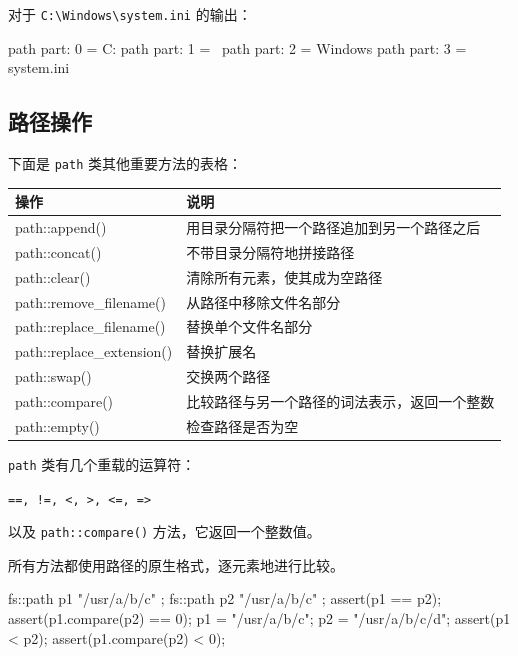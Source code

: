 对于 \texttt{C:\textbackslash Windows\textbackslash system.ini} 的输出：

\begin{codebox}[cpp]
path part: 0 = C:
path part: 1 = \
path part: 2 = Windows
path part: 3 = system.ini
\end{codebox}

\subsection{路径操作}

下面是 \texttt{path} 类其他重要方法的表格：

\begin{table}[H]
\centering
\begin{tabularx}{\textwidth}{>{\ttfamily\raggedright\arraybackslash}X >{\raggedright\arraybackslash}X}
\toprule
操作 & 说明 \\
\midrule
path::append() & 用目录分隔符把一个路径追加到另一个路径之后 \\
path::concat() & 不带目录分隔符地拼接路径 \\
path::clear() & 清除所有元素，使其成为空路径 \\
path::remove\_filename() & 从路径中移除文件名部分 \\
path::replace\_filename() & 替换单个文件名部分 \\
path::replace\_extension() & 替换扩展名 \\
path::swap() & 交换两个路径 \\
path::compare() & 比较路径与另一个路径的词法表示，返回一个整数 \\
path::empty() & 检查路径是否为空 \\
\bottomrule
\end{tabularx}
\end{table}


\texttt{path} 类有几个重载的运算符：

\texttt{==, !=, <, >, <=, =>}

以及 \texttt{path::compare()} 方法，它返回一个整数值。

所有方法都使用路径的原生格式，逐元素地进行比较。

\begin{codebox}[cpp]
fs::path p1 { "/usr/a/b/c" };
fs::path p2 { "/usr/a/b/c" };
assert(p1 == p2);
assert(p1.compare(p2) == 0);
p1 = "/usr/a/b/c";
p2 = "/usr/a/b/c/d";
assert(p1 < p2);
assert(p1.compare(p2) < 0);
\end{codebox}

